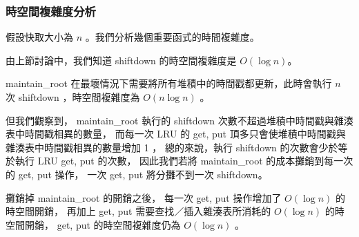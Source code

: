 \subsubsection{時空間複雜度分析}

假設快取大小為 $n$ 。我們分析幾個重要函式的時間複雜度。

由上節討論中，我們知道 shiftdown 的時空間複雜度是 $O(\log n)$。

maintain\_root 在最壞情況下需要將所有堆積中的時間戳都更新，此時會執行 $n$ 次 shiftdown ，時空間複雜度為 $O(n \log n)$ 。

但我們觀察到，
maintain\_root 執行的 shiftdown 次數不超過堆積中時間戳與雜湊表中時間戳相異的數量，
而每一次 LRU 的 get, put 頂多只會使堆積中時間戳與雜湊表中時間戳相異的數量增加 1 ，
總的來說，執行 shiftdown 的次數會少於等於執行 LRU get, put 的次數，
因此我們若將 maintain\_root 的成本攤銷到每一次的 get, put 操作，
一次 get, put 將分攤不到一次 shiftdown。

攤銷掉 maintain\_root 的開銷之後，
每一次 get, put 操作增加了 $O(\log n)$ 的時空間開銷，
再加上 get, put 需要查找／插入雜湊表所消耗的 $O(\log n)$ 的時空間開銷，
get, put 的時空間複雜度仍為 $O(\log n)$ 。